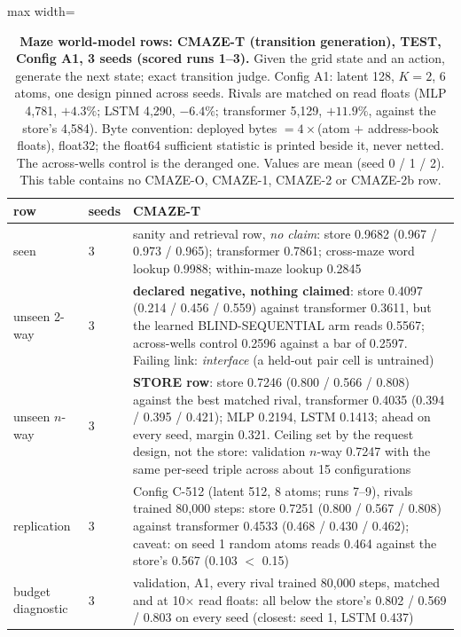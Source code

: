 \documentclass{article} %
\begin{document}
\begin{table}[h]
\centering\scriptsize
\caption{\textbf{Maze world-model rows: CMAZE-T (transition generation), TEST, Config A1, 3 seeds %
(scored runs 1--3).} Given the grid state and an action, generate the next state; exact
transition judge. Config A1: latent 128, $K=2$, 6 atoms, one design pinned across seeds. %
Rivals are matched on read floats (MLP 4,781, $+4.3\%$; LSTM 4,290, $-6.4\%$; transformer 5,129, %
$+11.9\%$, against the store's 4,584). %
Byte convention: deployed bytes $=4\times$(atom $+$
address-book floats), float32; the float64 sufficient statistic is printed beside it, never netted.
The across-wells control is the deranged one. Values are mean (seed 0 / 1 / 2). This table contains
no CMAZE-O, CMAZE-1, CMAZE-2 or CMAZE-2b row.}
\label{tab:cmazet}\label{tab:cmaze-del}
\setlength{\tabcolsep}{2pt}
\begin{adjustbox}{max width=\linewidth}\begin{tabular}{p{1.9cm}p{1.2cm}p{10.0cm}}
\toprule
row & seeds & CMAZE-T \\
\midrule
seen & 3 & sanity and retrieval row, \emph{no claim}: store 0.9682 (0.967 / 0.973 / 0.965); transformer 0.7861; cross-maze word lookup 0.9988; within-maze lookup 0.2845 \\
unseen 2-way & 3 & \textbf{declared negative, nothing claimed}: store 0.4097 (0.214 / 0.456 / 0.559) against transformer 0.3611, but the learned BLIND-SEQUENTIAL arm reads 0.5567; across-wells control 0.2596 against a bar of 0.2597. Failing link: \emph{interface} (a held-out pair cell is untrained) \\
unseen $n$-way & 3 & \textbf{STORE row}: store 0.7246 (0.800 / 0.566 / 0.808) against the best matched rival, transformer 0.4035 (0.394 / 0.395 / 0.421); MLP 0.2194, LSTM 0.1413; ahead on every seed, margin 0.321. Ceiling set by the request design, not the store: validation $n$-way 0.7247 with the same per-seed triple across about 15 configurations \\
\quad replication & 3 & Config C-512 (latent 512, 8 atoms; runs 7--9), rivals trained 80,000 steps: store 0.7251 (0.800 / 0.567 / 0.808) against transformer 0.4533 (0.468 / 0.430 / 0.462); caveat: on seed 1 random atoms reads 0.464 against the store's 0.567 (0.103 $<$ 0.15) \\
\quad budget diagnostic & 3 & validation, A1, every rival trained 80,000 steps, matched and at 10$\times$ read floats: all below the store's 0.802 / 0.569 / 0.803 on every seed (closest: seed 1, LSTM 0.437) \\

\end{tabular}
\end{adjustbox}
\end{table}
\end{document}
